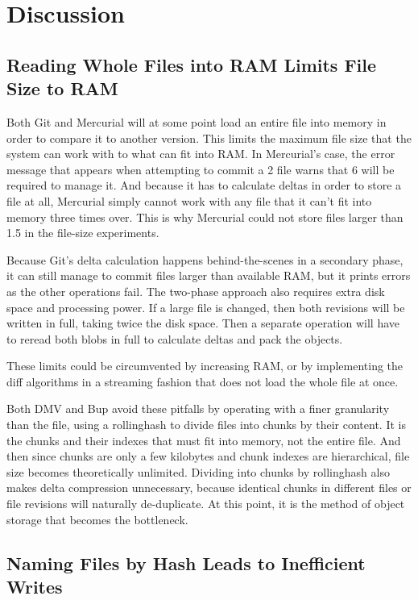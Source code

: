 \section{Discussion}

\subsection{Reading Whole Files into RAM Limits File Size to RAM}

Both Git and Mercurial will at some point load an entire file into memory in order to compare it to another version.
This limits the maximum file size that the system can work with to what can fit into RAM.
In Mercurial's case, the error message that appears when attempting to \gls{commit} a \SI{2}{\gib} file warns that \SI{6}{\gib} will be required to manage it.
And because it has to calculate deltas in order to store a file at all, Mercurial simply cannot work with any file that it can't fit into memory three times over.
This is why Mercurial could not store files larger than \SI{1.5}{\gib} in the file-size experiments.

Because Git's delta calculation happens behind-the-scenes in a secondary phase, it can still manage to \gls{commit} files larger than available RAM, but it prints errors as the other operations fail.
The two-phase approach also requires extra disk space and processing power.
If a large file is changed, then both revisions will be written in full, taking twice the disk space.
Then a separate operation will have to reread both \glspl{blob} in full to calculate deltas and pack the objects.

These limits could be circumvented by increasing RAM, or by implementing the diff algorithms in a streaming fashion that does not load the whole file at once.

Both \gls{DMV} and Bup avoid these pitfalls by operating with a finer granularity than the file, using a \gls{rollinghash} to divide files into chunks by their content.
It is the chunks and their indexes that must fit into memory, not the entire file.
And then since chunks are only a few kilobytes and chunk indexes are hierarchical, file size becomes theoretically unlimited.
Dividing into chunks by \gls{rollinghash} also makes delta compression unnecessary, because identical chunks in different files or file revisions will naturally de-duplicate.
At this point, it is the method of object storage that becomes the bottleneck.


\subsection{Naming Files by Hash Leads to Inefficient Writes}

